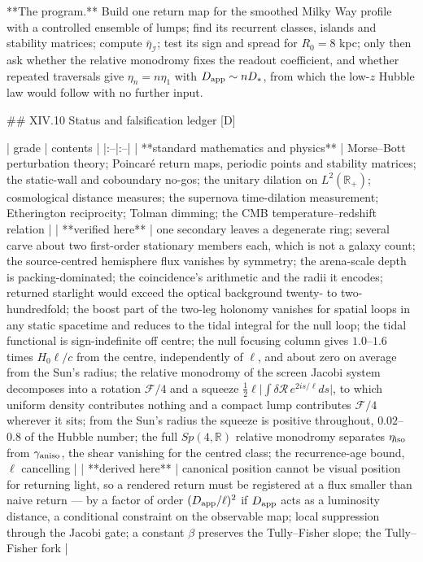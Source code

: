 **The program.** Build one return map for the smoothed Milky Way profile with a controlled ensemble of lumps; find its recurrent classes, islands and stability matrices; compute $\bar\eta_{\mathcal I}$; test its sign and spread for $R_0 = 8$ kpc; only then ask whether the relative monodromy fixes the readout coefficient, and whether repeated traversals give $\eta_n = n\eta_1$ with $D_{\rm app}\sim nD_\ast$, from which the low-$z$ Hubble law would follow with no further input.

## XIV.10 Status and falsification ledger [D]

| grade | contents |
|:--|:--|
| **standard mathematics and physics** | Morse–Bott perturbation theory; Poincaré return maps, periodic points and stability matrices; the static-wall and coboundary no-gos; the unitary dilation on $L^2(\mathbb R_+)$; cosmological distance measures; the supernova time-dilation measurement; Etherington reciprocity; Tolman dimming; the CMB temperature–redshift relation |
| **verified here** | one secondary leaves a degenerate ring; several carve about two first-order stationary members each, which is not a galaxy count; the source-centred hemisphere flux vanishes by symmetry; the arena-scale depth is packing-dominated; the coincidence's arithmetic and the radii it encodes; returned starlight would exceed the optical background twenty- to two-hundredfold; the boost part of the two-leg holonomy vanishes for spatial loops in any static spacetime and reduces to the tidal integral for the null loop; the tidal functional is sign-indefinite off centre; the null focusing column gives $1.0$–$1.6$ times $H_0\ell/c$ from the centre, independently of $\ell$, and about zero on average from the Sun's radius; the relative monodromy of the screen Jacobi system decomposes into a rotation $\mathcal F/4$ and a squeeze $\tfrac12\ell\lvert\int\delta\mathcal R\,e^{2is/\ell}ds\rvert$, to which uniform density contributes nothing and a compact lump contributes $\mathcal F/4$ wherever it sits; from the Sun's radius the squeeze is positive throughout, $0.02$–$0.8$ of the Hubble number; the full $Sp(4,\mathbb R)$ relative monodromy separates $\eta_{\rm iso}$ from $\gamma_{\rm aniso}$, the shear vanishing for the centred class; the recurrence-age bound, $\ell$ cancelling |
| **derived here** | canonical position cannot be visual position for returning light, so a rendered return must be registered at a flux smaller than naive return — by a factor of order $(D_{\rm app}/\ell)^2$ if $D_{\rm app}$ acts as a luminosity distance, a conditional constraint on the observable map; local suppression through the Jacobi gate; a constant $\beta$ preserves the Tully–Fisher slope; the Tully–Fisher fork |
